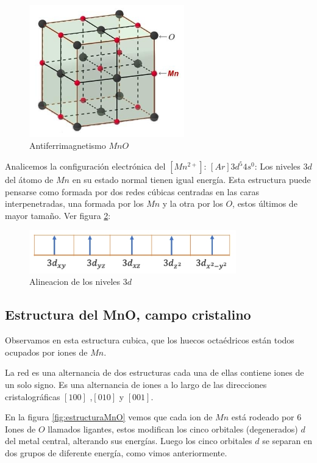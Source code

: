 \begin{figure}[H]
    \centering
    \includegraphics[width=0.6\textwidth]{./Figures/FerroAntiferri2}
	\caption{Antiferrimagnetismo $MnO$}
	\label{fig:FerroAntiferri2}
\end{figure}


Analicemos la configuración electrónica del $[Mn^{2+}]$: $[Ar]3d^{5}4s^{0}$: Los niveles $3d$ del átomo de $Mn$ en su estado normal tienen igual energía. Esta estructura puede pensarse como formada por dos redes cúbicas centradas en las caras interpenetradas, una formada por los $Mn$ y la otra por los $O$, estos últimos de mayor tamaño. Ver figura \ref{fig:FerroAntiferri3}:

\begin{figure}[H]
    \centering
    \includegraphics[width=0.8\textwidth]{./Figures/FerroAntiferri3}
	\caption{Alineacion de los niveles $3d$}
	\label{fig:FerroAntiferri3}
\end{figure}


\subsection{Estructura del MnO, campo cristalino}

Observamos en esta estructura cubica, que los huecos octaédricos están todos ocupados por iones de $Mn$.

La red es una alternancia de dos estructuras cada una de ellas contiene iones de un solo signo. Es una alternancia de iones a lo largo de las direcciones cristalográficas $[100]$ ,$[010]$ y $[001]$.

En la figura \ref{fig:estructuraMnO} vemos que cada ion de $Mn$ está rodeado por 6 Iones de $O$ llamados ligantes, estos modifican los cinco orbitales (degenerados) $d$ del metal central, alterando sus energías. Luego los cinco orbitales $d$ se separan en dos grupos de diferente energía, como vimos anteriormente.

